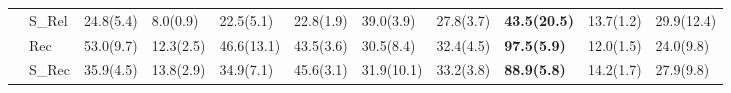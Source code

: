 \begin{table*}[!t]
{\begin{tabular}{l|llllllllll}
                                         & S\_Rel & 24.8(5.4)           & 8.0(0.9)   & 22.5(5.1)  & 22.8(1.9)  & 39.0(3.9)          & 27.8(3.7)          & \textbf{43.5(20.5)} & 13.7(1.2) & 29.9(12.4)          \\
                                         & Rec     & 53.0(9.7)           & 12.3(2.5)  & 46.6(13.1) & 43.5(3.6)  & 30.5(8.4)          & 32.4(4.5)          & \textbf{97.5(5.9)}  & 12.0(1.5) & 24.0(9.8)           \\
                                         & S\_Rec & 35.9(4.5)           & 13.8(2.9)  & 34.9(7.1)  & 45.6(3.1)  & 31.9(10.1)         & 33.2(3.8)          & \textbf{88.9(5.8)}  & 14.2(1.7) & 27.9(9.8)          
\\\bottomrule


\end{tabular}}
\end{table*}